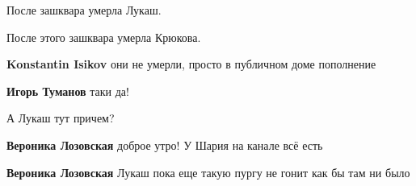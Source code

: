 \begin{itemize}
 
После зашквара умерла Лукаш.

После этого зашквара умерла Крюкова.

\begin{itemize}
 
\textbf{Konstantin Isikov} они не умерли, просто в публичном доме пополнение 🤣🤣🤣

 
\textbf{Игорь Туманов} таки да!

 
А Лукаш тут причем?

 
\textbf{Вероника Лозовская} доброе утро! У Шария на канале всё есть

 
\textbf{Вероника Лозовская} Лукаш пока еще такую пургу не гонит как бы там ни было

 

\end{itemize}
\end{itemize}

